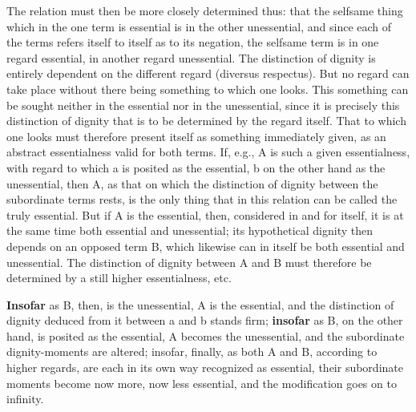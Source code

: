 \documentclass[12pt,a4paper,openany]{book}
\newcommand{\opage}[1]{\marginnote{\footnotesize\textit{[#1]}}}
\begin{document}
The relation must then be more closely determined thus: that the selfsame thing which in the one term is essential is in the other unessential, and since each of the terms refers itself to itself as to its negation, the selfsame term is in one regard essential, in another regard unessential. The distinction of dignity is entirely dependent on the different regard (diversus respectus). But no regard can take place without there being something to which one looks. This something can be sought neither in the essential nor in the unessential, since it is precisely this distinction of dignity that is to be determined by the regard itself. That to which one looks must therefore present itself as something immediately given, as an abstract essentialness valid for both terms. If, e.g., A is such a given essentialness, with regard to which a is posited as the essential, b on the other hand as the unessential, then A, as that on which the distinction of dignity between the subordinate terms rests, is the only thing that in this relation can be called the truly essential. But if A is the essential, then, considered in and for itself, it is at the same time both essential and unessential; its hypothetical dignity then depends on an opposed term B, which likewise can in itself be both essential and unessential. The distinction of dignity between A and B must therefore be determined by a still higher essentialness, etc.

\textbf{Insofar} as B, then, is the unessential, A is the essential, and the distinction of dignity deduced from it between a and b stands firm; \textbf{insofar} as B, on the other hand, is posited as the essential, A becomes the unessential,
\setcounter{footnote}{0}%
\opage{86}and the subordinate dignity-moments are altered; insofar, finally, as both A and B, according to higher regards, are each in its own way recognized as essential, their subordinate moments become now more, now less essential, and the modification goes on to infinity.
\end{document}
